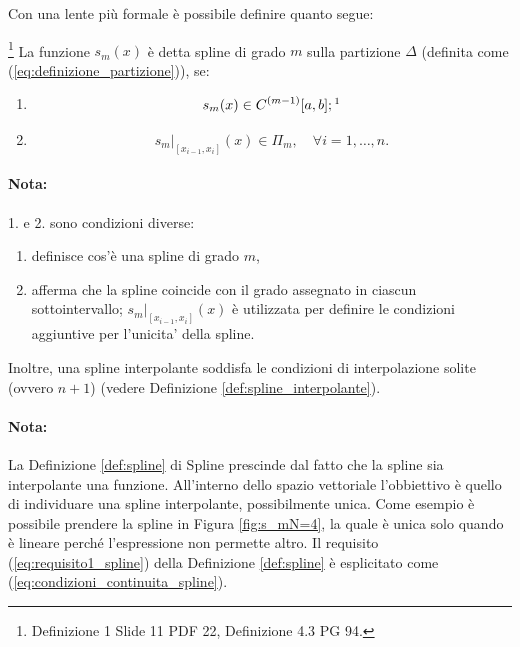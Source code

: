 Con una lente più formale è possibile definire quanto segue:
\begin{definition}\label{def:spline}
    \footnote{Definizione 1 Slide 11 PDF 22, Definizione 4.3 PG 94.}
    La funzione $s_m(x)$ è detta spline di grado $m$ sulla partizione $\Delta$ (definita come (\ref{eq:definizione_partizione})), se:
    \begin{enumerate}
        \item
        \begin{equation}\label{eq:requisito1_spline}
        	s_m(x)\in C^{(m-1)}[a,b]; \footnotemark
        \end{equation}
        \item
        \begin{equation}\label{eq:requisito2_spline}
        	s_m|_{[x_{i-1},x_i]}(x)\in\Pi_m,\quad \forall i=1,\hdots,n.
        \end{equation}
    \end{enumerate}
\end{definition}

\paragraph{Nota:} 1. e 2. sono condizioni diverse: 
\begin{enumerate}
	\item definisce cos'è una spline di grado $m$,
	\item afferma che la spline coincide con il grado assegnato in ciascun sottointervallo; $s_m|_{[x_{i-1},x_i]}(x)$ è utilizzata per definire le condizioni aggiuntive per l'unicita' della spline.
\end{enumerate}
Inoltre, una spline interpolante soddisfa le condizioni di interpolazione solite (ovvero $n+1$) (vedere Definizione \ref{def:spline_interpolante}).

\paragraph{Nota:} La Definizione \ref{def:spline} di Spline prescinde dal fatto che la spline sia interpolante una funzione. All'interno dello spazio vettoriale l'obbiettivo è quello di individuare una spline interpolante, possibilmente unica. Come esempio è possibile prendere la spline in Figura \ref{fig:s_mN=4}, la quale è unica solo quando è lineare perché l'espressione non permette altro. Il requisito (\ref{eq:requisito1_spline}) della Definizione \ref{def:spline} è esplicitato come (\ref{eq:condizioni_continuita_spline}).

